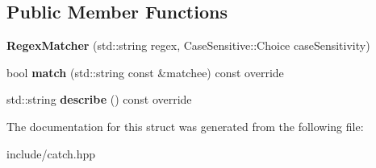 \subsection*{Public Member Functions}
\begin{DoxyCompactItemize}
\item 
{\bfseries Regex\+Matcher} (std\+::string regex, Case\+Sensitive\+::\+Choice case\+Sensitivity)\hypertarget{structCatch_1_1Matchers_1_1StdString_1_1RegexMatcher_ab914deb885fe25558c41ab368c6b3916}{}\label{structCatch_1_1Matchers_1_1StdString_1_1RegexMatcher_ab914deb885fe25558c41ab368c6b3916}

\item 
bool {\bfseries match} (std\+::string const \&matchee) const override\hypertarget{structCatch_1_1Matchers_1_1StdString_1_1RegexMatcher_aa8e61adccabb2f36133029301f6b8f4e}{}\label{structCatch_1_1Matchers_1_1StdString_1_1RegexMatcher_aa8e61adccabb2f36133029301f6b8f4e}

\item 
std\+::string {\bfseries describe} () const override\hypertarget{structCatch_1_1Matchers_1_1StdString_1_1RegexMatcher_a1f788cd5258c987e5043f6c7f43adeb9}{}\label{structCatch_1_1Matchers_1_1StdString_1_1RegexMatcher_a1f788cd5258c987e5043f6c7f43adeb9}

\end{DoxyCompactItemize}


The documentation for this struct was generated from the following file\+:\begin{DoxyCompactItemize}
\item 
include/catch.\+hpp\end{DoxyCompactItemize}
